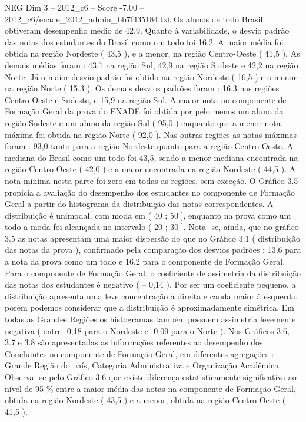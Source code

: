 \begin{textsample}{NEG Dim 3 – 2012\_c6 – Score -7.00 – 2012\_c6/enade\_2012\_admin\_bb7f435184.txt}
Os alunos de todo Brasil obtiveram desempenho médio de 42,9.
Quanto à variabilidade, o desvio padrão das notas dos estudantes do Brasil como um todo foi 16,2.
A maior média foi obtida na região Nordeste ( 43,5 ), e a menor, na região Centro-Oeste ( 41,5 ).
As demais médias foram : 43,1 na região Sul, 42,9 na região Sudeste e 42,2 na região Norte.
Já o maior desvio padrão foi obtido na região Nordeste ( 16,5 ) e o menor na região Norte ( 15,3 ).
Os demais desvios padrões foram : 16,3 nas regiões Centro-Oeste e Sudeste, e 15,9 na região Sul.
A maior nota no componente de Formação Geral da prova do ENADE foi obtida por pelo menos um aluno da região Sudeste e um aluno da região Sul ( 95,0 ) enquanto que a menor nota máxima foi obtida na região Norte ( 92,0 ).
Nas outras regiões as notas máximas foram : 93,0 tanto para a região Nordeste quanto para a região Centro-Oeste.
A mediana do Brasil como um todo foi 43,5, sendo a menor mediana encontrada na região Centro-Oeste ( 42,0 ) e a maior encontrada na região Nordeste ( 44,5 ).
A nota mínima nesta parte foi zero em todas as regiões, sem exceção.
O Gráfico 3.5 propicia a avaliação do desempenho dos estudantes no componente de Formação Geral a partir do histograma da distribuição das notas correspondentes.
A distribuição é unimodal, com moda em ( 40 ; 50 ], enquanto na prova como um todo a moda foi alcançada no intervalo ( 20 ; 30 ].
Nota -se, ainda, que no gráfico 3.5 as notas apresentam uma maior dispersão do que no Gráfico 3.1 ( distribuição das notas da prova ), confirmado pela comparação dos desvios padrões : 13,6 para a nota da prova como um todo e 16,2 para o componente de Formação Geral.
Para o componente de Formação Geral, o coeficiente de assimetria da distribuição das notas dos estudantes é negativo ( – 0,14 ).
Por ser um coeficiente pequeno, a distribuição apresenta uma leve concentração à direita e cauda maior à esquerda, porém podemos considerar que a distribuição é aproximadamente simétrica.
Em todas as Grandes Regiões os histogramas também possuem assimetria levemente negativa ( entre -0,18 para o Nordeste e -0,09 para o Norte ).
Nos Gráficos 3.6, 3.7 e 3.8 são apresentadas as informações referentes ao desempenho dos Concluintes no componente de Formação Geral, em diferentes agregações : Grande Região do país, Categoria Administrativa e Organização Acadêmica.
Observa -se pelo Gráfico 3.6 que existe diferença estatisticamente significativa ao nível de 95 \% entre a maior média das notas na componente de Formação Geral, obtida na região Nordeste ( 43,5 ) e a menor, obtida na região Centro-Oeste ( 41,5 ).

\end{textsample}
